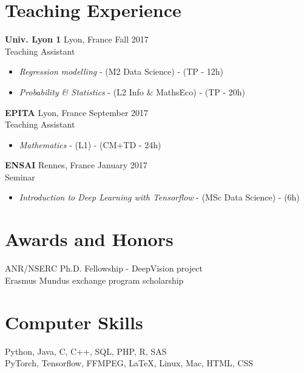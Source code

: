 \documentclass[10pt]{res} %
\begin{document}
\begin{resume}
\section{\large Teaching Experience} 
\textbf{Univ. Lyon 1} \hfill Lyon, France \hfill Fall 2017 \\
Teaching Assistant
\begin{itemize}
	\item \textit{Regression modelling}  - (M2 Data Science) - (TP - 12h)
	\item \textit{Probability \& Statistics}  - (L2 Info \& MathsEco) - (TP - 20h)
\end{itemize}

\textbf{EPITA} \hfill Lyon, France \hfill September 2017 \\
Teaching Assistant
\begin{itemize}
	\item \textit{Mathematics} - (L1) - (CM+TD - 24h)
\end{itemize}

\textbf{ENSAI} \hfill Rennes, France \hfill January 2017 \\
Seminar
\begin{itemize}
\item \textit{Introduction to Deep Learning with Tensorflow} - (MSc Data Science) - (6h)
\end{itemize}


\section{\large Awards and Honors} 
ANR/NSERC Ph.D. Fellowship - DeepVision project \\
Erasmus Mundus exchange program scholarship


\section{\large Computer Skills} 
Python, Java, C, C++, SQL, PHP, R, SAS \\
PyTorch, Tensorflow, FFMPEG, \LaTeX, Linux, Mac, HTML, CSS



\end{resume}
\end{document}
